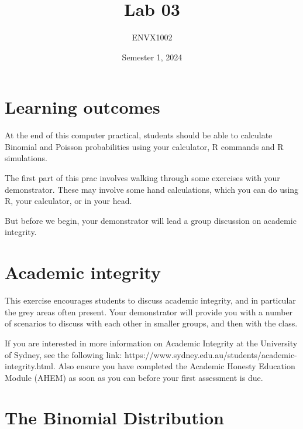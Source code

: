\documentclass[
  10pt,
  letterpaper,
  DIV=11,
  numbers=noendperiod]{scrartcl}
\title{Lab 03}
\subtitle{ENVX1002}
\author{}
\date{Semester 1, 2024}
\makeatletter
\renewcommand{\maketitle}{\bgroup\setlength{\parindent}{0pt}
\begin{flushleft}
  {\sffamily\huge\textbf{\MakeUppercase{\@title}}} \vspace{0.3cm} \newline
  {\Large {\@subtitle}} \newline
  \@author
\end{flushleft}\egroup
}
\renewcommand*\contentsname{Table of contents}
\newcommand\contentsname{Table of contents}
\makeatother
\begin{document}
\maketitle
\pagestyle{usyd}

\ifdefined\Shaded\renewenvironment{Shaded}{\begin{tcolorbox}[colback={codebgcolor}, enhanced, boxrule=0pt, breakable, sharp corners, borderline west={3pt}{0pt}{shadecolor}, frame hidden]}{\end{tcolorbox}}\fi

\renewcommand*\contentsname{Table of contents}
{
\hypersetup{linkcolor=}
\setcounter{tocdepth}{3}
\tableofcontents
}
\hypertarget{learning-outcomes}{%
\section{Learning outcomes}\label{learning-outcomes}}

At the end of this computer practical, students should be able to
calculate Binomial and Poisson probabilities using your calculator, R
commands and R simulations.

The first part of this prac involves walking through some exercises with
your demonstrator. These may involve some hand calculations, which you
can do using R, your calculator, or in your head.

But before we begin, your demonstrator will lead a group discussion on
academic integrity.

\hypertarget{academic-integrity}{%
\section{Academic integrity}\label{academic-integrity}}

This exercise encourages students to discuss academic integrity, and in
particular the grey areas often present. Your demonstrator will provide
you with a number of scenarios to discuss with each other in smaller
groups, and then with the class.

If you are interested in more information on Academic Integrity at the
University of Sydney, see the following link:
https://www.sydney.edu.au/students/academic-integrity.html. Also ensure
you have completed the Academic Honesty Education Module (AHEM) as soon
as you can before your first assessment is due.

\hypertarget{the-binomial-distribution}{%
\section{The Binomial Distribution}\label{the-binomial-distribution}}
\end{document}
